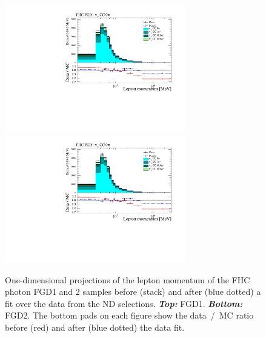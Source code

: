 \begin{figure}[ht]
  \center
  \includegraphics[keepaspectratio=true,width=0.7\textwidth,page=25]{images/BANFF/reactionCodeStacks_PrefitAndPostfit_mom.pdf}\\
  \includegraphics[keepaspectratio=true,width=0.7\textwidth,page=26]{images/BANFF/reactionCodeStacks_PrefitAndPostfit_mom.pdf}
  \begin{center}
    \caption[FHC photon FGD1 and 2 samples before and after a fit over
    the data from the ND280 selections]{One-dimensional projections of
      the lepton momentum of the \Gls{FHC} photon \Gls{FGD}1 and 2
      samples before (stack) and after (blue dotted) a fit over the
      data from the \Gls{ND} selections. \textbf{\textit{Top:}}
      \Gls{FGD}1. \textbf{\textit{Bottom:}} \Gls{FGD}2. The bottom
      pads on each figure show the data~/~\Gls{MC} ratio before (red)
      and after (blue dotted) the data fit.}
    \label{fig:gamma}
  \end{center}
\end{figure}


